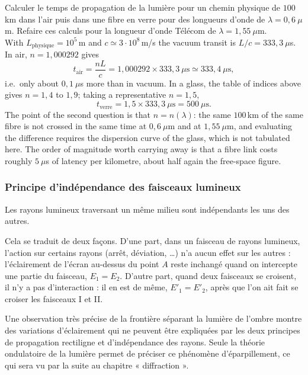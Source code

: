 \begin{example}
  Calculer le temps de propagation de la lumière pour un chemin physique de
  $100$\,km dans l'air puis dans une fibre en verre pour des longueurs d'onde de
  $\lambda = 0{,}6\ \mu$m. Refaire ces calculs pour la longueur d'onde Télécom de
  $\lambda = 1{,}55\ \mu$m.\\

  With $L_{\text{physique}} = 10^{5}$\,m and $c \simeq 3\cdot 10^{8}$\,m/s the
  vacuum transit is $L/c = 333{,}3\ \mu$s. In air, $n = 1{,}000292$ gives
  \[ t_{\text{air}} = \frac{n L}{c} = 1{,}000292 \times 333{,}3\ \mu\mathrm{s}
     \simeq 333{,}4\ \mu\mathrm{s}, \]
  i.e.\ only about $0{,}1\ \mu$s more than in vacuum. In a glass, the table of
  indices above gives $n = 1{,}4$ to $1{,}9$; taking a representative
  $n = 1{,}5$,
  \[ t_{\text{verre}} = 1{,}5 \times 333{,}3\ \mu\mathrm{s} = 500\ \mu\mathrm{s}. \]
  The point of the second question is that $n = n(\lambda)$: the same $100$\,km
  of the same fibre is not crossed in the same time at $0{,}6\ \mu$m and at
  $1{,}55\ \mu$m, and evaluating the difference requires the dispersion curve of
  the glass, which is not tabulated here. The order of magnitude worth carrying
  away is that a fibre link costs roughly $5\ \mu$s of latency per kilometre,
  about half again the free-space figure.
\end{example}

\subsubsection{Principe d'indépendance des faisceaux lumineux}

\begin{postulate}
  Les rayons lumineux traversant un même milieu sont indépendants les uns des
  autres.
\end{postulate}

Cela se traduit de deux façons. D'une part, dans un faisceau de rayons lumineux,
l'action sur certains rayons (arrêt, déviation, \dots) n'a aucun effet sur les
autres : l'éclairement de l'écran au-dessus du point $A$ reste inchangé quand on
intercepte une partie du faisceau, $E_1 = E_2$. D'autre part, quand deux
faisceaux se croisent, il n'y a pas d'interaction : il en est de même,
$E'_1 = E'_2$, après que l'on ait fait se croiser les faisceaux I et II.

\begin{remark}
  Une observation très précise de la frontière séparant la lumière de l'ombre
  montre des variations d'éclairement qui ne peuvent être expliquées par les deux
  principes de propagation rectiligne et d'indépendance des rayons. Seule la
  théorie ondulatoire de la lumière permet de préciser ce phénomène
  d'éparpillement, ce qui sera vu par la suite au chapitre « diffraction ».
\end{remark}

